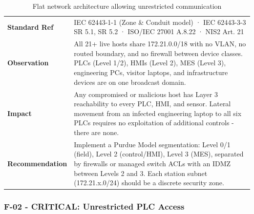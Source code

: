 \begin{table}[H]
\centering
\begin{tabular}{@{}p{}p{}@{}}
\toprule
\textbf{Standard Ref} & IEC 62443-1-1 (Zone \& Conduit model) · IEC 62443-3-3 SR 5.1, SR 5.2 · ISO/IEC 27001 A.8.22 · NIS2 Art. 21 \\
\textbf{Observation} & All 21+ live hosts share 172.21.0.0/18 with no VLAN, no routed boundary, and no firewall between device classes. PLCs (Level 1/2), HMIs (Level 2), MES (Level 3), engineering PCs, visitor laptops, and infrastructure devices are on one broadcast domain. \\
\textbf{Impact} & Any compromised or malicious host has Layer 3 reachability to every PLC, HMI, and sensor. Lateral movement from an infected engineering laptop to all six PLCs requires no exploitation of additional controls - there are none. \\
\textbf{Recommendation} & Implement a Purdue Model segmentation: Level 0/1 (field), Level 2 (control/HMI), Level 3 (MES), separated by firewalls or managed switch ACLs with an IDMZ between Levels 2 and 3. Each station subnet (172.21.x.0/24) should be a discrete security zone. \\
\bottomrule
\end{tabular}
\caption{Flat network architecture allowing unrestricted communication}
\end{table}

\subsubsection{F-02 - CRITICAL: Unrestricted PLC Access}

